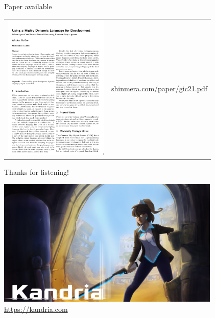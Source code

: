\documentclass[14pt,t,aspectratio=169]{beamer}
\renewcommand{\title}[1]{
  {\huge #1} \vskip 0.4cm
}
\begin{document}
\begin{frame}
  \title{Paper available}
  \begin{tabular}{m{5cm}m{10cm}}
    \includegraphics[width=5cm]{paper.png} & \url{shinmera.com/paper/gic21.pdf}
  \end{tabular}
\end{frame}

\begin{frame}
  \title{Thanks for listening!}
  \centering
  \includegraphics[width=0.8\textwidth]{main capsule.png} \\
  \url{https://kandria.com}
\end{frame}
\end{document}
